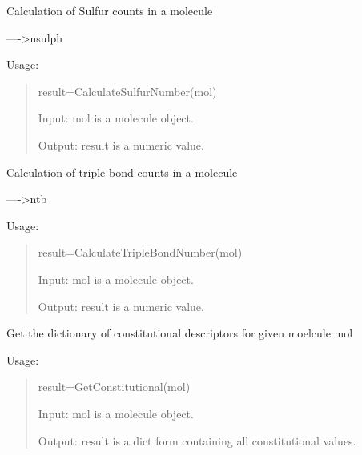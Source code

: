 \documentclass[letterpaper,10pt,english]{sphinxmanual}
\begin{document}

\begin{fulllineitems}
\label{reference/constitution:constitution.CalculateSulfurNumber}
Calculation of Sulfur counts in a molecule

----\textgreater{}nsulph

Usage:
\begin{quote}

result=CalculateSulfurNumber(mol)

Input: mol is a molecule object.

Output: result is a numeric value.
\end{quote}

\end{fulllineitems}


\begin{fulllineitems}
\label{reference/constitution:constitution.CalculateTripleBondNumber}
Calculation of triple bond counts in a molecule

----\textgreater{}ntb

Usage:
\begin{quote}

result=CalculateTripleBondNumber(mol)

Input: mol is a molecule object.

Output: result is a numeric value.
\end{quote}

\end{fulllineitems}


\begin{fulllineitems}
\label{reference/constitution:constitution.GetConstitutional}
Get the dictionary of constitutional descriptors for given moelcule mol

Usage:
\begin{quote}

result=GetConstitutional(mol)

Input: mol is a molecule object.

Output: result is a dict form containing all constitutional values.
\end{quote}

\end{fulllineitems}
\end{document}
